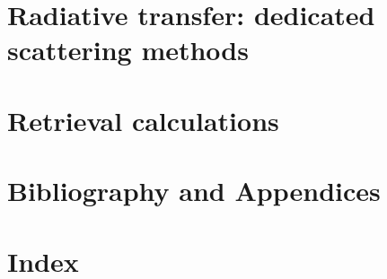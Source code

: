 \documentclass[11pt,twoside,a4paper,fleqn]{book}
\begin{document}
\part{Radiative transfer: dedicated 
      scattering methods}



\part{Retrieval calculations}


\part{Bibliography and Appendices}
%



\part{Index}
%
\printindex


\end{document}
